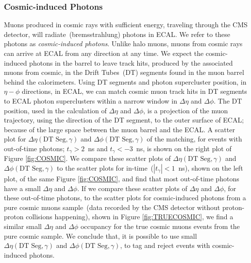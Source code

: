 \subsubsection{Cosmic-induced Photons} 
Muons produced in cosmic rays with sufficient energy, traveling through the CMS detector, will radiate~(bremsstrahlung) photons in ECAL. We refer to these photons as \textit{cosmic-induced photons}. Unlike halo muons, muons from cosmic rays can arrive at ECAL from any direction at any time. We expect the cosmic-induced photons in the barrel to leave track hits, produced by the associated muons from cosmic, in the Drift Tubes~(DT) segments found in the muon barrel behind the calorimeters.
\newline
 Using DT segments and  photon supercluster position, in $\eta-\phi$ directions, in ECAL, we can match cosmic muon track hits in DT segments to ECAL photon superclusters within a narrow window in $\Delta\eta$ and $\Delta\phi$. The DT position, used in the calculation of $\Delta\eta$ and $\Delta\phi$, is a projection of the muon trajectory, using the direction of the DT segment, to the outer surface of ECAL; because of the large space between the muon barrel and the ECAL. A scatter plot for $\Delta\eta(\mbox{DT Seg},\gamma)$ and $\Delta\phi(\mbox{DT Seg},\gamma)$ of the matching, for events with out-of-time photons; $t_{\gamma} > 2$~ns and $t_{\gamma} < -3$~ns, is shown on the right plot of Figure \ref{fig:COSMIC}. We compare these scatter plots of $\Delta\eta(\mbox{DT Seg},\gamma)$ and $\Delta\phi(\mbox{DT Seg},\gamma)$ to the scatter plots for in-time~($|t_{\gamma}| < 1$~ns), shown on the left plot, of the same Figure \ref{fig:COSMIC}, and find that most out-of-time photons have a small $\Delta\eta$ and $\Delta\phi$. 
 \newline
If we compare these scatter plots of $\Delta\eta$  and $\Delta\phi$, for these out-of-time photons, to the scatter plots for cosmic-induced photons from a pure cosmic muons sample~(data recorded by the CMS detector without proton-proton collisions happening), shown in Figure \ref{fig:TRUECOSMIC}, we find a similar small $\Delta\eta$ and $\Delta\phi$ occupancy for the true cosmic muons events from the pure cosmic sample. We conclude that, it is possible to use small $\Delta\eta(\mbox{DT Seg},\gamma)$  and $\Delta\phi(\mbox{DT Seg},\gamma)$, to tag and reject events with cosmic-induced photons.

